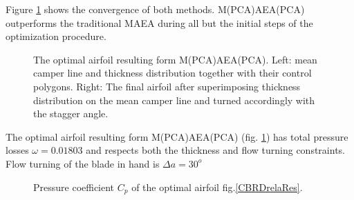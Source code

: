 Figure \ref{PCADrelaRes} shows the convergence of both methods. M(PCA)AEA(PCA) outperforms the traditional MAEA during all but the initial steps of the optimization procedure. 

\begin{figure}[h!]
\begin{minipage}[b]{1\linewidth}
 \centering
\end{minipage}
\caption{The optimal airfoil resulting form M(PCA)AEA(PCA). Left: mean camper line and thickness distribution together with their control polygons. Right: The final airfoil after superimposing thickness distribution on the mean camper line and turned accordingly with the stagger angle.} 
\label{PCADrelaRes}
\end{figure}

The optimal airfoil resulting form M(PCA)AEA(PCA) (fig. \ref{PCADrelaRes}) has total pressure losses $\omega=0.01803$ and respects both the thickness and flow turning constraints.  Flow turning of the blade in hand is $\Delta a=30^o$

\begin{figure}[h!]
\begin{minipage}[b]{1\linewidth}
 \centering
\end{minipage}
\caption{Pressure coefficient $C_p$ of the optimal airfoil fig.\ref{CBRDrelaRes}.} 
\label{PCADrelaRes_cp}
\end{figure}

